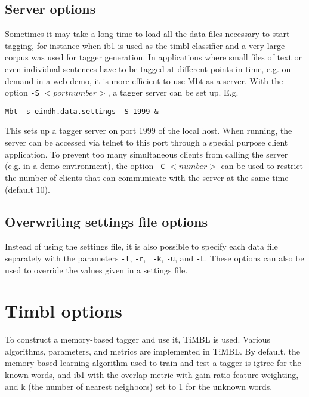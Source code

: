 \documentclass{report}
\begin{document}
\subsection{Server options}

Sometimes it may take a long time to load all the data files necessary
to start tagging, for instance when {\sc ib1} is used as the {\sc
timbl} classifier and a very large corpus was used for tagger
generation. In applications where small files of text or even
individual sentences have to be tagged at different points in time,
e.g. on demand in a web demo, it is more efficient to use Mbt as
a server. With the option {\tt -S} $<portnumber>$, a tagger server can be
set up. E.g.

{\small
\begin{verbatim}
Mbt -s eindh.data.settings -S 1999 &
\end{verbatim}
}

This sets up a tagger server on port 1999 of the local host. When
running, the server can be accessed via telnet to this port through a
special purpose client application. To prevent too many simultaneous
clients from calling the server (e.g. in a demo environment), the
option {\tt -C} $<number>$ can be used to restrict the number of
clients that can communicate with the server at the same time (default
10).


\subsection{Overwriting settings file options}

Instead of using the settings file, it is also possible to specify
each data file separately with the parameters {\tt -l}, {\tt -r}, {\tt
-k}, {\tt -u}, and {\tt -L}. These options can also be used to
override the values given in a settings file.

\section{Timbl options}

To construct a memory-based tagger and use it, TiMBL is
used. Various algorithms, parameters, and metrics are implemented in
TiMBL. By default, the memory-based learning algorithm used to
train and test a tagger is {\sc igtree} for the known words, and {\sc
ib1} with the overlap metric with gain ratio feature weighting, and k
(the number of nearest neighbors) set to 1 for the unknown words.
\end{document}
